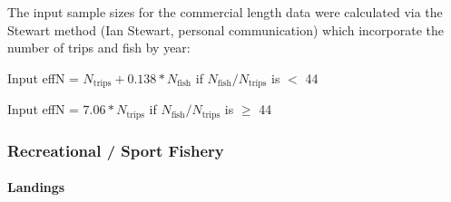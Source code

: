 \documentclass[11pt,
  english,
  letterpaper,
]{article}
\begin{document}
\leavevmode\tagmcend\tagstructend\par


The input sample sizes for the commercial length data were calculated via the Stewart method (Ian Stewart, personal communication) which incorporate the number of trips and fish by year:

\leavevmode\tagmcend\tagstructend\par

\begin{centering}

Input effN = $N_{\text{trips}} + 0.138 * N_{\text{fish}}$ if $N_{\text{fish}}/N_{\text{trips}}$ is $<$ 44

Input effN = $7.06 * N_{\text{trips}}$ if $N_{\text{fish}}/N_{\text{trips}}$ is $\geq$ 44

\end{centering}


\hypertarget{recreational-sport-fishery}{%
\subsubsection{Recreational / Sport Fishery}\label{recreational-sport-fishery}}

\leavevmode\tagmcend\tagstructend


\hypertarget{landings-1}{%
\paragraph{Landings}\label{landings-1}}

\leavevmode\tagmcend\tagstructend

\end{document}
